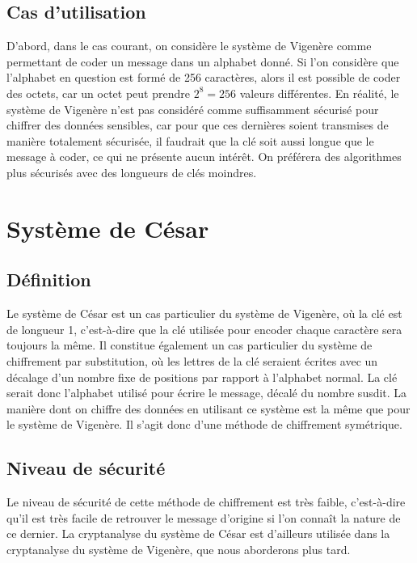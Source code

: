 		\subsection{Cas d'utilisation}
			D'abord, dans le cas courant, on considère le système de Vigenère comme permettant de coder un message dans un alphabet donné. Si l'on considère que l'alphabet en question est formé de 256 caractères, alors il est possible de coder des octets, car un octet peut prendre $2^8 = 256$ valeurs différentes. En réalité, le système de Vigenère n'est pas considéré comme suffisamment sécurisé pour chiffrer des données sensibles, car pour que ces dernières soient transmises de manière totalement sécurisée, il faudrait que la clé soit aussi longue que le message à coder, ce qui ne présente aucun intérêt. On préférera des algorithmes plus sécurisés avec des longueurs de clés moindres.
	\section{Système de César}
		\subsection{Définition}
			Le système de César est un cas particulier du système de Vigenère, où la clé est de longueur 1, c'est-à-dire que la clé utilisée pour encoder chaque caractère sera toujours la même. Il constitue également un cas particulier du système de chiffrement par substitution, où les lettres de la clé seraient écrites avec un décalage d'un nombre fixe de positions par rapport à l'alphabet normal. La clé serait donc l'alphabet utilisé pour écrire le message, décalé du nombre susdit.
			La manière dont on chiffre des données en utilisant ce système est la même que pour le système de Vigenère. Il s'agit donc d'une méthode de chiffrement symétrique.
		\subsection{Niveau de sécurité}
			Le niveau de sécurité de cette méthode de chiffrement est très faible, c'est-à-dire qu'il est très facile de retrouver le message d'origine si l'on connaît la nature de ce dernier. La cryptanalyse du système de César est d'ailleurs utilisée dans la cryptanalyse du système de Vigenère, que nous aborderons plus tard.
